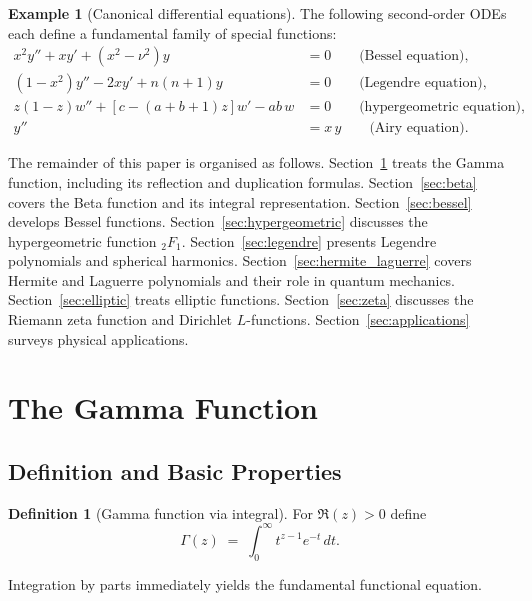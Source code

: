 \documentclass[12pt,a4paper]{amsart}
\theoremstyle{definition}
\newtheorem{definition}[theorem]{Definition}
\newtheorem{example}[theorem]{Example}
\begin{document}
\begin{example}[Canonical differential equations]
The following second-order ODEs each define a fundamental family of special functions:
\begin{align}
  x^2 y'' + x y' + (x^2 - \nu^2)y &= 0 \qquad \text{(Bessel equation)},\label{eq:bessel_ode}\\
  (1-x^2)y'' - 2xy' + n(n+1)y &= 0 \qquad \text{(Legendre equation)},\label{eq:legendre_ode}\\
  z(1-z)w'' + [c-(a+b+1)z]w' - ab\,w &= 0 \qquad \text{(hypergeometric equation)},\label{eq:hyp_ode}\\
  y'' &= x\,y \qquad \text{(Airy equation)}.\label{eq:airy_ode}
\end{align}
\end{example}

The remainder of this paper is organised as follows.
Section~\ref{sec:gamma} treats the Gamma function, including its reflection and
duplication formulas.  Section~\ref{sec:beta} covers the Beta function and its integral
representation.  Section~\ref{sec:bessel} develops Bessel functions.
Section~\ref{sec:hypergeometric} discusses the hypergeometric function \({}_2F_1\).
Section~\ref{sec:legendre} presents Legendre polynomials and spherical harmonics.
Section~\ref{sec:hermite_laguerre} covers Hermite and Laguerre polynomials and their role
in quantum mechanics.  Section~\ref{sec:elliptic} treats elliptic functions.
Section~\ref{sec:zeta} discusses the Riemann zeta function and Dirichlet \(L\)-functions.
Section~\ref{sec:applications} surveys physical applications.

\section{The Gamma Function}
\label{sec:gamma}

\subsection{Definition and Basic Properties}

\begin{definition}[Gamma function via integral]
For \(\Re(z) > 0\) define
\[
  \Gamma(z) \;=\; \int_0^\infty t^{z-1} e^{-t}\,dt.
\]
\end{definition}

Integration by parts immediately yields the fundamental functional equation.
\end{document}

